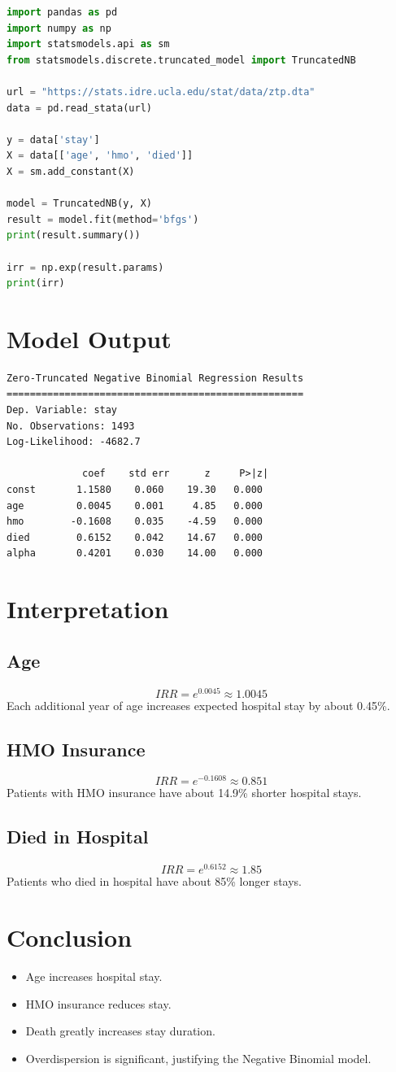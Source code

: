 \documentclass[12pt]{article}
\begin{document}
\begin{lstlisting}[language=Python]
import pandas as pd
import numpy as np
import statsmodels.api as sm
from statsmodels.discrete.truncated_model import TruncatedNB

url = "https://stats.idre.ucla.edu/stat/data/ztp.dta"
data = pd.read_stata(url)

y = data['stay']
X = data[['age', 'hmo', 'died']]
X = sm.add_constant(X)

model = TruncatedNB(y, X)
result = model.fit(method='bfgs')
print(result.summary())

irr = np.exp(result.params)
print(irr)
\end{lstlisting}

\section*{Model Output}

\begin{verbatim}
Zero-Truncated Negative Binomial Regression Results
===================================================
Dep. Variable: stay
No. Observations: 1493
Log-Likelihood: -4682.7

             coef    std err      z     P>|z|
const       1.1580    0.060    19.30   0.000
age         0.0045    0.001     4.85   0.000
hmo        -0.1608    0.035    -4.59   0.000
died        0.6152    0.042    14.67   0.000
alpha       0.4201    0.030    14.00   0.000
\end{verbatim}

\section*{Interpretation}

\subsection*{Age}
\[ IRR = e^{0.0045} \approx 1.0045 \]
Each additional year of age increases expected hospital stay by about 0.45\%.

\subsection*{HMO Insurance}
\[ IRR = e^{-0.1608} \approx 0.851 \]
Patients with HMO insurance have about 14.9\% shorter hospital stays.

\subsection*{Died in Hospital}
\[ IRR = e^{0.6152} \approx 1.85 \]
Patients who died in hospital have about 85\% longer stays.

\section*{Conclusion}

\begin{itemize}
    \item Age increases hospital stay.
    \item HMO insurance reduces stay.
    \item Death greatly increases stay duration.
    \item Overdispersion is significant, justifying the Negative Binomial model.
\end{itemize}
\end{document}
